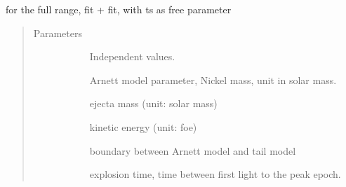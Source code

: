 \documentclass[letterpaper,10pt,english]{sphinxmanual}
\begin{document}
\begin{fulllineitems}
\label{\detokenize{generated/sdapy.models.arnett_tail.joint_fit_Mej_Ek:sdapy.models.arnett_tail.joint_fit_Mej_Ek}}
for the full range,  fit +  fit, with ts as free parameter
\begin{quote}\begin{description}
\item[{Parameters}] \leavevmode\begin{description}
\item[{}] \leavevmode{[}\sphinxtitleref{array}{]}
Independent values.

\item[{}] \leavevmode{[}\sphinxtitleref{float}{]}
Arnett model parameter, Nickel mass, unit in solar mass.

\item[{}] \leavevmode{[}\sphinxtitleref{float}{]}
ejecta mass (unit: solar mass)

\item[{}] \leavevmode{[}\sphinxtitleref{float}{]}
kinetic energy (unit: foe)

\item[{}] \leavevmode{[}\sphinxtitleref{float}{]}
boundary between Arnett model and tail model

\item[{}] \leavevmode{[}\sphinxtitleref{float}{]}
explosion time, time between first light to the peak epoch.

\end{description}

\end{description}\end{quote}

\end{fulllineitems}


\end{document}
